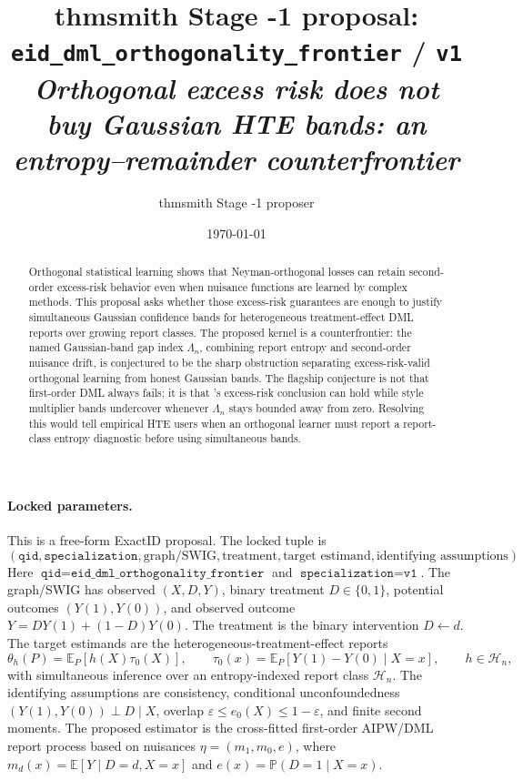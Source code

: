\documentclass[11pt]{article}
\title{thmsmith Stage -1 proposal: \texttt{eid\_dml\_orthogonality\_frontier} / \texttt{v1}%
  \\ \large\textit{Orthogonal excess risk does not buy Gaussian HTE bands: an entropy--remainder counterfrontier}}
\author{thmsmith Stage -1 proposer}
\date{\today}
\newcommand{\E}{\mathbb{E}}
\renewcommand{\Pr}{\mathbb{P}}
\newcommand{\calH}{\mathcal{H}}
\theoremstyle{definition}
\theoremstyle{plain}
\theoremstyle{remark}
\begin{document}
\maketitle


\paragraph{Locked parameters.}
This is a free-form ExactID proposal.  The locked tuple is
\[
(\texttt{qid},\texttt{specialization},\text{graph/SWIG},\text{treatment},
\text{target estimand},\text{identifying assumptions}).
\]
Here \(\texttt{qid}=\texttt{eid\_dml\_orthogonality\_frontier}\) and
\(\texttt{specialization}=\texttt{v1}\).  The graph/SWIG has observed
\((X,D,Y)\), binary treatment \(D\in\{0,1\}\), potential outcomes
\((Y(1),Y(0))\), and observed outcome \(Y=DY(1)+(1-D)Y(0)\).  The treatment is
the binary intervention \(D\leftarrow d\).  The target estimands are the
heterogeneous-treatment-effect reports
\[
\theta_h(P)=\E_P[h(X)\tau_0(X)],\qquad
\tau_0(x)=\E_P[Y(1)-Y(0)\mid X=x],\qquad h\in\calH_n,
\]
with simultaneous inference over an entropy-indexed report class \(\calH_n\).
The identifying assumptions are consistency, conditional unconfoundedness
\((Y(1),Y(0))\perp D\mid X\), overlap \(\varepsilon\leq e_0(X)\leq 1-\varepsilon\),
and finite second moments.  The proposed estimator is the cross-fitted
first-order AIPW/DML report process based on nuisances
\(\eta=(m_1,m_0,e)\), where \(m_d(x)=\E[Y\mid D=d,X=x]\) and
\(e(x)=\Pr(D=1\mid X=x)\).

\begin{abstract}
Orthogonal statistical learning shows that Neyman-orthogonal losses can retain
second-order excess-risk behavior even when nuisance functions are learned by
complex methods.  This proposal asks whether those excess-risk guarantees are
enough to justify simultaneous Gaussian confidence bands for heterogeneous
treatment-effect DML reports over growing report classes.  The proposed kernel
is a counterfrontier: the named Gaussian-band gap index
\(\Lambda_n\), combining report entropy and second-order nuisance drift, is
conjectured to be the sharp obstruction separating excess-risk-valid
orthogonal learning from honest Gaussian bands.  The flagship conjecture is not
that first-order DML always fails; it is that \citet{FosterSyrgkanis2023OSL}'s
excess-risk conclusion can hold while \citet{SemenovaChernozhukov2021DMLCATE}
style multiplier bands undercover whenever \(\Lambda_n\) stays bounded away
from zero.  Resolving this would tell empirical HTE users when an orthogonal
learner must report a report-class entropy diagnostic before using simultaneous
bands.
\end{abstract}
\end{document}
